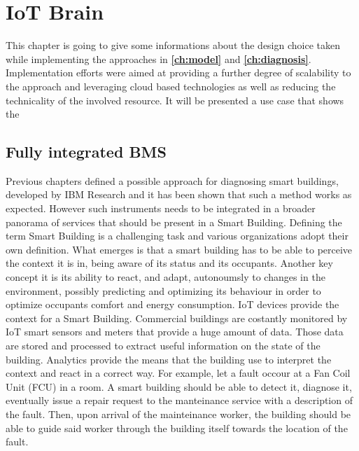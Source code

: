 \chapter{IoT Brain} \label{ch:framework}

This chapter is going to give some informations about the design choice taken while implementing the approaches in \textbf{\autoref{ch:model}} and \textbf{\autoref{ch:diagnosis}}.
Implementation efforts were aimed at providing a further degree of scalability to the approach and leveraging cloud based technologies as well as reducing the technicality of the involved resource.
It will be presented a use case that shows the %
\section{Fully integrated BMS}
Previous chapters defined a possible approach for diagnosing smart buildings, developed by IBM Research and it has been shown that such a method works as expected.
However such instruments needs to be integrated in a broader panorama of services that should be present in a Smart Building. Defining the term Smart Building is a challenging task and various organizations adopt their own definition. %
What emerges is that a smart building has to be able to perceive the context it is in, being aware of its status and its occupants. Another key concept it is its ability to react, and adapt, autonoumsly to changes in the environment, possibly predicting and optimizing its behaviour in order to optimize occupants comfort and energy consumption.
IoT devices provide the context for a Smart Building. Commercial buildings are costantly monitored by IoT smart sensors and meters that provide a huge amount of data. Those data are stored and processed to extract useful information on the state of the building. %
Analytics provide the means that the building use to interpret the context and react in a correct way. For example, let a fault occour at a Fan Coil Unit (FCU) in a room. A smart building should be able to detect it, diagnose it, eventually issue a repair request to the manteinance service with a description of the fault. Then, upon arrival of the mainteinance worker, the building should be able to guide said worker through the building itself towards the location of the fault.

